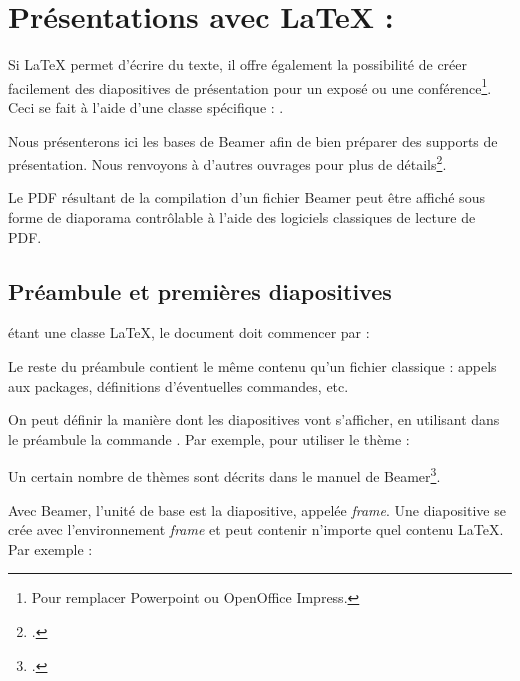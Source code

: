 \chapter{Présentations avec \LaTeX{} : }\label{beamer}

\begin{intro}
Si \LaTeX{} permet d'écrire du texte, il offre également la possibilité de créer facilement des diapositives de présentation pour un exposé ou une conférence\footnote{Pour remplacer Powerpoint ou OpenOffice Impress.}. Ceci se fait à l'aide d'une classe spécifique : .

Nous présenterons ici les bases de Beamer afin de bien préparer des supports de présentation. Nous renvoyons à d'autres ouvrages pour plus de détails\footcites[On consultera pour une introduction plus approfondie][]{intro_beamer}[pour les usages avancées on se servira du manuel : ][]{beamer}.

Le PDF résultant de la compilation d'un fichier Beamer peut être affiché sous forme de diaporama contrôlable à l'aide des logiciels classiques de lecture de PDF.
\end{intro}

\section{Préambule et premières diapositives}

 étant une classe \LaTeX{}, le document doit commencer par :


Le reste du préambule contient le même contenu qu'un fichier  classique : appels aux packages, définitions d'éventuelles commandes, etc.

On peut définir la manière dont les diapositives vont s'afficher, en utilisant dans le préambule la commande . Par exemple, pour utiliser le thème  :

\begin{latexcode}
\end{latexcode}

Un certain nombre de thèmes sont décrits dans le manuel de Beamer\footcite{beamer_theme}.

Avec Beamer, l'unité de base  est la diapositive, appelée \textenglish{\emph{frame}}. Une diapositive se crée avec l'environnement \emph{frame} et peut contenir n'importe quel contenu \LaTeX{}.
Par exemple :

